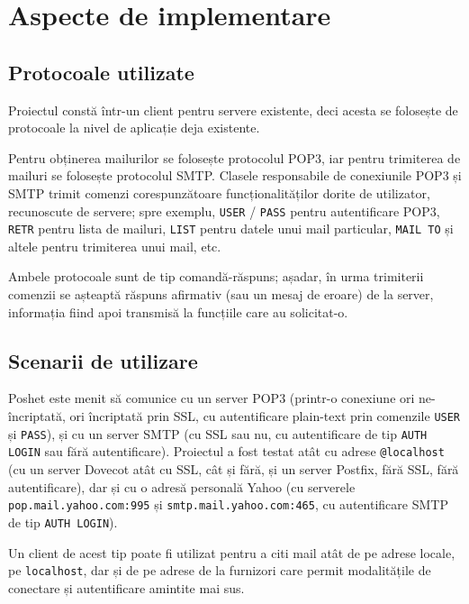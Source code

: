 \documentclass[runningheads]{llncs}
\begin{document}
\newpage




\section{Aspecte de implementare}

\subsection{Protocoale utilizate}
Proiectul constă într-un client pentru servere existente, deci acesta se folosește de protocoale la nivel de aplicație deja existente.

Pentru obținerea mailurilor se folosește protocolul POP3\cite{ref_rfc_pop3}, iar pentru trimiterea de mailuri se folosește protocolul SMTP\cite{ref_rfc_smtp}. Clasele responsabile de conexiunile POP3 și SMTP trimit comenzi corespunzătoare funcționalităților dorite de utilizator, recunoscute de servere; spre exemplu, \texttt{USER} / \texttt{PASS} pentru autentificare POP3, \texttt{RETR} pentru lista de mailuri, \texttt{LIST} pentru datele unui mail particular, \texttt{MAIL TO} și altele pentru trimiterea unui mail, etc.

Ambele protocoale sunt de tip comandă-răspuns; așadar, în urma trimiterii comenzii se așteaptă răspuns afirmativ (sau un mesaj de eroare) de la server, informația fiind apoi transmisă la funcțiile care au solicitat-o.

\subsection{Scenarii de utilizare}
Poshet este menit să comunice cu un server POP3 (printr-o conexiune ori ne-încriptată, ori încriptată prin SSL, cu autentificare plain-text prin comenzile \texttt{USER} și \texttt{PASS}), și cu un server SMTP (cu SSL sau nu, cu autentificare de tip \texttt{AUTH LOGIN} sau fără autentificare). Proiectul a fost testat atât cu adrese \texttt{@localhost} (cu un server Dovecot atât cu SSL, cât și fără, și un server Postfix, fără SSL, fără autentificare), dar și cu o adresă personală Yahoo (cu serverele \texttt{pop.mail.yahoo.com:995} și \texttt{smtp.mail.yahoo.com:465}, cu autentificare SMTP de tip \texttt{AUTH LOGIN}).

Un client de acest tip poate fi utilizat pentru a citi mail atât de pe adrese locale, pe \texttt{localhost}, dar și de pe adrese de la furnizori care permit modalitățile de conectare și autentificare amintite mai sus.
\end{document}

